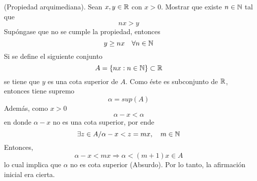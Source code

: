 \item (Propiedad arquimediana). Sean $x,y\in\mathbb{R}$ con $x>0$. Mostrar que existe $n\in\mathbb{N}$ tal que\[nx>y\]
    Supóngase que no se cumple la propiedad, entonces \[y\geq nx\quad\forall n\in\mathbb{N}\]
    Si se define el siguiente conjunto\[A=\{nx:n\in\mathbb{N}\}\subset\mathbb{R}\]
    se tiene que $y$ es una cota superior de $A$. Como éste es subconjunto de $\mathbb{R}$, entonces tiene supremo\[\alpha=sup(A)\]
    Además, como $x>0$\[\alpha-x<\alpha\]
    en donde $\alpha-x$ no es una cota superior, por ende\[\exists z\in A/\alpha-x<z=mx,\quad m\in\mathbb{N}\]
    Entonces,\[\alpha-x<mx\Rightarrow\alpha<(m+1)x\in A\]
    lo cual implica que $\alpha$ no es cota superior (Absurdo). Por lo tanto, la afirmación inicial era cierta.
